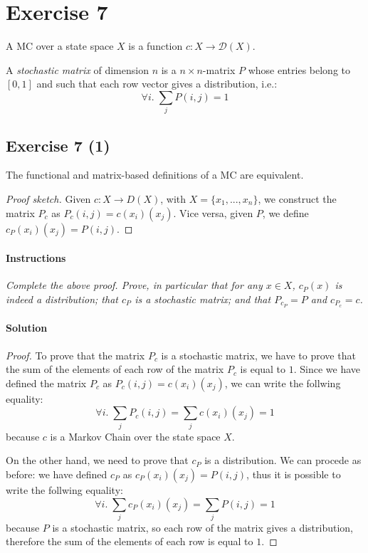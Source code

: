 \section*{Exercise 7}

\begin{definition} 
    \normalfont A MC over a state space $X$ is a function $ c: X \to \mathcal{D}(X) $.
\end{definition}
\begin{definition}
    \normalfont A \textit{stochastic matrix} of dimension $n$ is a $ n \times n$-matrix $P$ whose entries belong to $[0, 1]$ and
    such that each row vector gives a distribution, i.e.:
    \[ \forall i.\; \sum_{j} P(i, j) = 1 \]
\end{definition}

\subsection*{Exercise 7 (1)}
\begin{proposition}
    The functional and matrix-based definitions of a MC are equivalent.
\end{proposition}

\begin{proof}[Proof sketch]
    Given $ c : X \to  D(X) $, with $ X = \{x_{1}, . . . , x_{n}\} $, we construct the 
    matrix $ P_{c} $ as $ P_{c}(i, j) = c(x_{i})(x_{j}) $. 
    Vice versa, given $ P $, we define $ c_{P}(x_{i})(x_{j}) = P(i, j) $.
\end{proof}

\paragraph{Instructions} \textit{Complete the above proof. Prove, in particular that for any $ x \in X $, $ c_{P} (x) $ is indeed a 
distribution; that $ c_{P} $ is a stochastic matrix; and that $ P_{c_{P}} = P $ and $ c_{P_{c}} = c $.}

\paragraph{Solution}
\begin{proof}
    To prove that the matrix $P_{c}$ is a stochastic matrix, we have to prove that the sum of the elements of each row of the matrix
    $P_{c}$ is equal to $1$.
    Since we have defined the matrix $P_{c}$ as $ P_{c}(i, j) = c(x_{i})(x_{j}) $, we can write the follwing equality:
    \[ \forall i.\;\sum_{j} P_{c}(i, j) = \sum_{j} c(x_{i})(x_{j}) = 1 \]
    because $c$ is a Markov Chain over the state space $X$.

   On the other hand, we need to prove that $c_{P}$ is a distribution. We can procede as before: we have defined $c_{P}$ as
   $ c_{P}(x_{i})(x_{j}) = P(i, j)$, thus it is possible to write the follwing equality:
   \[ \forall i.\;\sum_{j} c_{P}(x_{i})(x_{j}) = \sum_{j} P(i, j) = 1 \]
   because $P$ is a stochastic matrix, so each row of the matrix gives a distribution, therefore the sum of the elements of each row is
   equal to $1$.
\end{proof}


